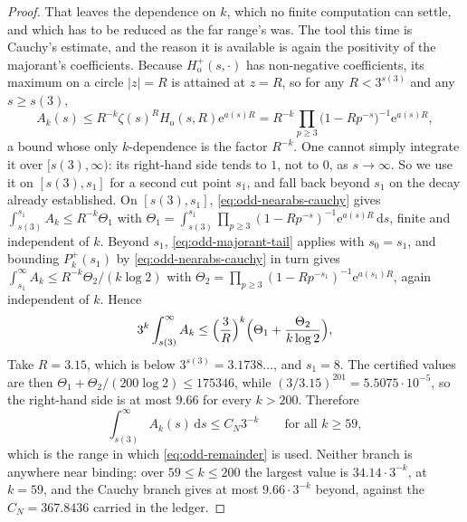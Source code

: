 \documentclass[11pt]{amsart}
\theoremstyle{plain}
\theoremstyle{definition}
\newcommand{\e}{\mathrm e}
\newcommand{\dd}{\,\mathrm d}
\newcommand{\abs}[1]{\lvert #1\rvert}
\begin{document}
\begin{proof}
That leaves the dependence on $k$, which no finite computation can settle,
and which has to be reduced as the far range's was. The tool this time is
Cauchy's estimate, and the reason it is available is again the positivity of
the majorant's coefficients. Because $H_{\mathrm o}^+(s,\cdot)$ has non-negative
coefficients, its maximum on a circle $\abs z=R$ is attained at $z=R$, so for
any $R<3^{s(3)}$ and any $s\geq s(3)$,
\begin{equation}\label{eq:odd-nearabs-cauchy}
 A_k(s)\leq R^{-k}\zeta(s)^RH_{\mathrm o}(s,R)\e^{a(s)R}
 =R^{-k}\!\!\prod_{p\geq3}\bigl(1-Rp^{-s}\bigr)^{-1}\e^{a(s)R},
\end{equation}
a bound whose only $k$-dependence is the factor $R^{-k}$. One cannot simply
integrate it over $[s(3),\infty)$: its right-hand side tends to $1$, not to
$0$, as $s\to\infty$. So we use it on $[s(3),s_1]$ for a second cut point
$s_1$, and fall back beyond $s_1$ on the decay already established. On $[s(3),s_1]$, \eqref{eq:odd-nearabs-cauchy} gives
$\int_{s(3)}^{s_1}A_k\leq R^{-k}\Theta_1$ with
$\Theta_1=\int_{s(3)}^{s_1}\prod_{p\geq3}(1-Rp^{-s})^{-1}\e^{a(s)R}\dd s$,
finite and independent of $k$. Beyond $s_1$, \eqref{eq:odd-majorant-tail}
applies with $s_0=s_1$, and bounding $P_k^+(s_1)$ by
\eqref{eq:odd-nearabs-cauchy} in turn gives
$\int_{s_1}^\infty A_k\leq R^{-k}\Theta_2/(k\log2)$ with
$\Theta_2=\prod_{p\geq3}(1-Rp^{-s_1})^{-1}\e^{a(s_1)R}$, again independent of
$k$. Hence
\[
 3^k\int_{s(3)}^\infty A_k
 \leq\Bigl(\frac3R\Bigr)^{k}\Bigl(\Theta_1+\frac{\Theta_2}{k\log2}\Bigr),
\]
Take $R=3.15$, which is below $3^{s(3)}=3.1738\ldots$, and $s_1=8$. The
certified values are then $\Theta_1+\Theta_2/(200\log2)\leq175346$, while
$(3/3.15)^{201}=5.5075\cdot10^{-5}$, so the right-hand side is at most
$9.66$ for every $k>200$. Therefore
\begin{equation}\label{eq:odd-nearabs-all-k}
 \int_{s(3)}^\infty A_k(s)\dd s\leq C_N3^{-k}
 \qquad\text{for all }k\geq59,
\end{equation}
which is the range in which \eqref{eq:odd-remainder} is used. Neither branch is anywhere near binding: over
$59\leq k\leq200$ the largest value is $34.14\cdot3^{-k}$, at $k=59$, and the
Cauchy branch gives at most $9.66\cdot3^{-k}$ beyond, against the
$C_N=367.8436$ carried in the ledger.


\end{proof}
\end{document}
